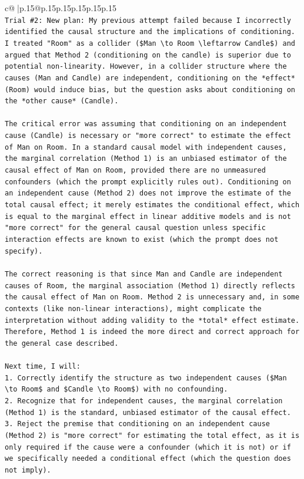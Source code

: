 \documentclass{article}
\begin{document}
{\begin{supertabular}{c@{$\;$}|p{.15\linewidth}@{}p{.15\linewidth}p{.15\linewidth}p{.15\linewidth}p{.15\linewidth}p{.15\linewidth}}
{{{\\ 
\texttt{Trial \#2: New plan: My previous attempt failed because I incorrectly identified the causal structure and the implications of conditioning. I treated "Room" as a collider (\$Man \textbackslash{}to Room \textbackslash{}leftarrow Candle\$) and argued that Method 2 (conditioning on the candle) is superior due to potential non{-}linearity. However, in a collider structure where the causes (Man and Candle) are independent, conditioning on the *effect* (Room) would induce bias, but the question asks about conditioning on the *other cause* (Candle).} \\
\\ 
\texttt{The critical error was assuming that conditioning on an independent cause (Candle) is necessary or "more correct" to estimate the effect of Man on Room. In a standard causal model with independent causes, the marginal correlation (Method 1) is an unbiased estimator of the causal effect of Man on Room, provided there are no unmeasured confounders (which the prompt explicitly rules out). Conditioning on an independent cause (Method 2) does not improve the estimate of the total causal effect; it merely estimates the conditional effect, which is equal to the marginal effect in linear additive models and is not "more correct" for the general causal question unless specific interaction effects are known to exist (which the prompt does not specify).} \\
\\ 
\texttt{The correct reasoning is that since Man and Candle are independent causes of Room, the marginal association (Method 1) directly reflects the causal effect of Man on Room. Method 2 is unnecessary and, in some contexts (like non{-}linear interactions), might complicate the interpretation without adding validity to the *total* effect estimate. Therefore, Method 1 is indeed the more direct and correct approach for the general case described.} \\
\\ 
\texttt{Next time, I will:} \\
\texttt{1.  Correctly identify the structure as two independent causes (\$Man \textbackslash{}to Room\$ and \$Candle \textbackslash{}to Room\$) with no confounding.} \\
\texttt{2.  Recognize that for independent causes, the marginal correlation (Method 1) is the standard, unbiased estimator of the causal effect.} \\
\texttt{3.  Reject the premise that conditioning on an independent cause (Method 2) is "more correct" for estimating the total effect, as it is only required if the cause were a confounder (which it is not) or if we specifically needed a conditional effect (which the question does not imply).} \\
}}}
\end{supertabular}}
\end{document}
